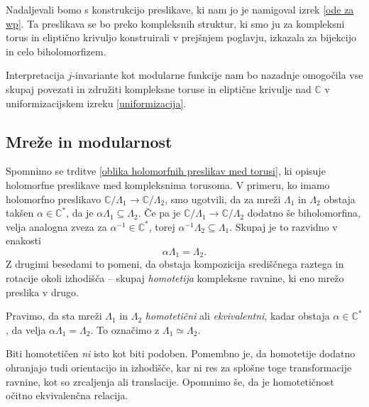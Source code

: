 \documentclass[mat1]{fmfdelo}
\numberwithin{equation}{section}
\newcommand{\C}{\mathbb C}
\newcommand{\CM}{\mathbb C ^*}
\newcommand{\inv}{^{-1}}
\newcommand{\htp}{\simeq}
\theoremstyle{definition}
\begin{document}
Nadaljevali bomo s konstrukcijo preslikave, ki nam jo je namigoval izrek \ref{ode za wp}. Ta preslikava se bo preko kompleksnih struktur, ki smo ju za kompleksni torus in eliptično krivuljo konstruirali v prejšnjem poglavju, izkazala za bijekcijo in celo biholomorfizem. 

Interpretacija $j$-invariante kot modularne funkcije nam bo nazadnje omogočila vse skupaj povezati in združiti kompleksne toruse in eliptične krivulje nad $\C$ v uniformizacijskem izreku \ref{uniformizacija}. 

\subsection{Mreže in modularnost}
Spomnimo se trditve \ref{oblika holomorfnih preslikav med torusi}, ki opisuje holomorfne preslikave med kompleksnima torusoma. V primeru, ko imamo holomorfno preslikavo $\C/\Lambda_1 \to \C/\Lambda_2$, smo ugotvili, da za mreži $\Lambda_1$ in $\Lambda_2$ obstaja takšen $\alpha \in \CM$, da je $\alpha\Lambda_1 \subseteq \Lambda_2$. Če pa je $\C/\Lambda_1 \to \C/\Lambda_2$ dodatno še biholomorfina, velja analogna zveza za $\alpha\inv \in \CM$, torej $\alpha\inv\Lambda_2 \subseteq \Lambda_1$. Skupaj je to razvidno v enakosti
\[
    \alpha\Lambda_1 = \Lambda_2. 
\]
Z drugimi besedami to pomeni, da obstaja kompozicija središčnega raztega in rotacije okoli izhodišča -- skupaj \emph{homotetija} kompleksne ravnine, ki eno mrežo preslika v drugo. 

\begin{definicija}
    Pravimo, da sta mreži $\Lambda_1$ in $\Lambda_2$ \emph{homotetični} ali \emph{ekvivalentni}, kadar obstaja $\alpha \in \CM$, da velja $\alpha\Lambda_1 = \Lambda_2$. To označimo z $\Lambda_1 \htp \Lambda_2$.
\end{definicija}

\begin{opomba}
    Biti homotetičen \emph{ni} isto kot biti podoben. Pomembno je, da homotetije dodatno ohranjajo tudi orientacijo in izhodišče, kar ni res za splošne toge transformacije ravnine, kot so zrcaljenja ali translacije. Opomnimo še, da je homotetičnost očitno ekvivalenčna relacija.
\end{opomba}
\end{document}
